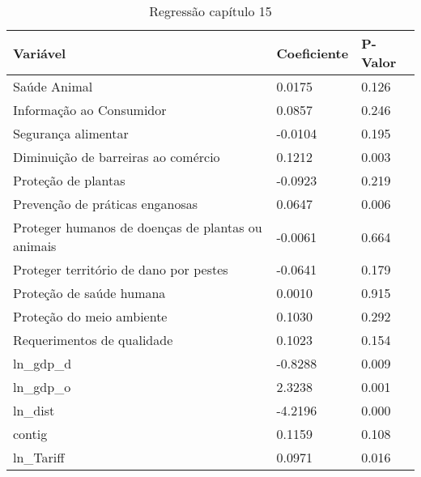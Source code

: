 \begin{table}[h]
    \begin{tabular}{@{}l|l|l@{}}
    \toprule
    Variável                                          & Coeficiente & \multicolumn{1}{l|}{P-Valor} \\ \midrule
    Saúde Animal                                      & 0.0175      & \multicolumn{1}{l|}{0.126}   \\ \midrule
    Informação ao Consumidor                          & 0.0857      & 0.246                        \\ \midrule
    Segurança alimentar                               & -0.0104     & 0.195                        \\ \midrule
    Diminuição de barreiras ao comércio               & 0.1212      & 0.003                        \\ \midrule
    Proteção de plantas                               & -0.0923     & 0.219                        \\ \midrule
    Prevenção de práticas enganosas                   & 0.0647      & 0.006                        \\ \midrule
    Proteger humanos de doenças de plantas ou animais & -0.0061     & 0.664                        \\ \midrule
    Proteger território de dano por pestes            & -0.0641     & 0.179                        \\ \midrule
    Proteção de saúde humana                          & 0.0010      & 0.915                        \\ \midrule
    Proteção do meio ambiente                         & 0.1030      & 0.292                        \\ \midrule
    Requerimentos de qualidade                        & 0.1023      & 0.154                        \\ \midrule
    ln\_gdp\_d                                        & -0.8288     & 0.009                        \\ \midrule
    ln\_gdp\_o                                        & 2.3238      & 0.001                        \\ \midrule
    ln\_dist                                          & -4.2196     & 0.000                        \\ \midrule
    contig                                            & 0.1159      & 0.108                        \\ \midrule
    ln\_Tariff                                        & 0.0971      & 0.016                        \\ \bottomrule
    \end{tabular}
    \caption{Regressão capítulo 15}
    \label{tab:my-table}
    \end{table}